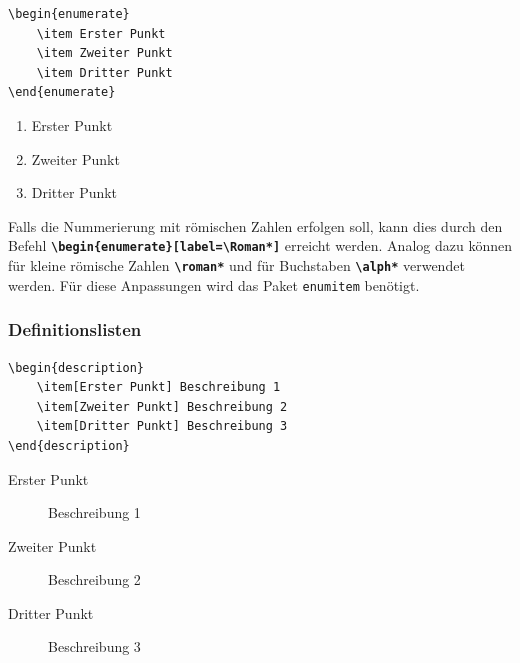 \begin{minipage}{0.58\textwidth}
    \begin{lstlisting}[language={[LaTeX]TeX}]
\begin{enumerate}
    \item Erster Punkt
    \item Zweiter Punkt
    \item Dritter Punkt
\end{enumerate}
\end{lstlisting}
\end{minipage}
\hfill
\begin{minipage}{0.35\textwidth}
    \begin{enumerate}
        \item Erster Punkt
        \item Zweiter Punkt
        \item Dritter Punkt
    \end{enumerate}
\end{minipage}

Falls die Nummerierung mit römischen Zahlen erfolgen soll, kann dies durch den Befehl \textbf{\texttt{\textbackslash begin\{enumerate\}[label=\textbackslash Roman*]}} erreicht werden. Analog dazu können für kleine römische Zahlen \textbf{\texttt{\textbackslash roman*}} und für Buchstaben \textbf{\texttt{\textbackslash alph*}} verwendet werden. Für diese Anpassungen wird das Paket \texttt{enumitem} benötigt.

\subsubsection{Definitionslisten}

\begin{minipage}{0.58\textwidth}
    \begin{lstlisting}[language={[LaTeX]TeX}]
\begin{description}
    \item[Erster Punkt] Beschreibung 1
    \item[Zweiter Punkt] Beschreibung 2
    \item[Dritter Punkt] Beschreibung 3
\end{description}
\end{lstlisting}
\end{minipage}
\hfill
\begin{minipage}{0.35\textwidth}
    \begin{description}
        \item[Erster Punkt] Beschreibung 1
        \item[Zweiter Punkt] Beschreibung 2
        \item[Dritter Punkt] Beschreibung 3
    \end{description}
\end{minipage}

